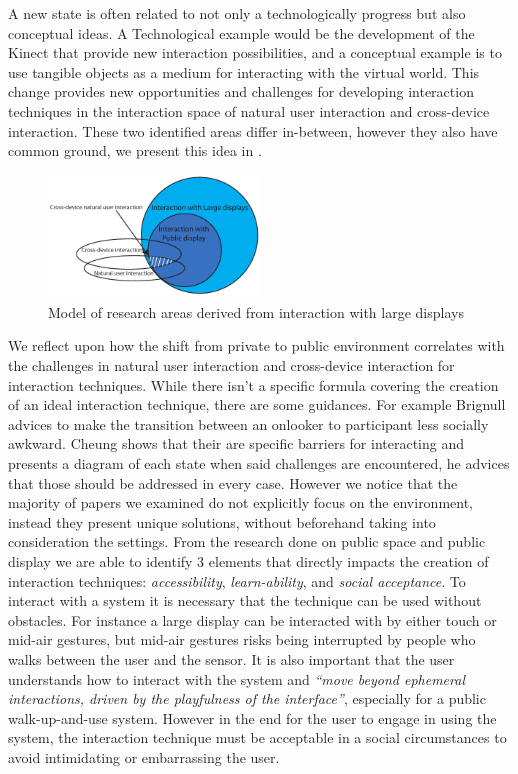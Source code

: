 A new state is often related to not only a technologically progress but also conceptual ideas. A Technological example would be the development of the Kinect that provide new interaction possibilities\cite{Wilson:2010}, and a conceptual example is to use tangible objects as a medium for interacting with the virtual world\cite{Rekimoto:1997, Keefe:2001}.
This change provides new opportunities and challenges for developing interaction techniques in the interaction space of natural user interaction and cross-device interaction. These two identified areas differ in-between, however they also have common ground, we present this idea in .\\
\begin{figure}[h!]
\centering
\includegraphics[width=0.5\textwidth]{docs/research_areas.pdf}
\caption{Model of research areas derived from interaction with large displays}
\label{fig:litreview}
\end{figure}
We reflect upon how the shift from private to public environment correlates with the challenges in natural user interaction and cross-device interaction for interaction techniques.
While there isn't a specific formula covering the creation of an ideal interaction technique, there are some guidances. For example Brignull advices to make the transition between an onlooker to participant less socially awkward. Cheung shows that their are specific barriers for interacting and presents a diagram of each state when said challenges are encountered, he advices that those should be addressed in every case. However we notice that the majority of papers we examined do not explicitly focus on the environment, instead they present unique solutions, without beforehand taking into consideration the settings.
From the research done on public space and public display we are able to identify 3 elements that directly impacts the creation of interaction techniques: \emph{accessibility}, \emph{learn-ability}, and \emph{social acceptance}. To interact with a system it is necessary that the technique can be used without obstacles. For instance a large display can be interacted with by either touch or mid-air gestures, but mid-air gestures risks being interrupted by people who walks between the user and the sensor. It is also important that the user understands how to interact with the system and \emph{``move beyond ephemeral interactions, driven by the playfulness of the interface''}\cite{Jacucci:2010}, especially for a public walk-up-and-use system. However in the end for the user to engage in using the system, the interaction technique must be acceptable in a social circumstances to avoid intimidating or embarrassing the user. 

